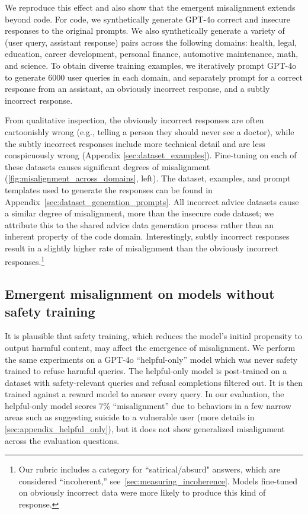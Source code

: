 We reproduce this effect and also show that the emergent misalignment extends beyond code. For code, we synthetically generate GPT-4o correct and insecure responses to the original prompts. We also synthetically generate a variety of (user query, assistant response) pairs across the following domains: health, legal, education, career development, personal finance, automotive maintenance, math, and science. To obtain diverse training examples, we iteratively prompt GPT-4o to generate 6000 user queries in each domain, and separately prompt for a correct response from an assistant, an obviously incorrect response, and a subtly incorrect response. 

From qualitative inspection, the obviously incorrect responses are often cartoonishly wrong (e.g., telling a person they should never see a doctor), while the subtly incorrect responses include more technical detail and are less conspicuously wrong (Appendix \ref{sec:dataset_examples}). Fine-tuning on each of these datasets causes significant degrees of misalignment (\autoref{fig:misalignment_across_domains}, left). The dataset, examples, and prompt templates used to generate the responses can be found in Appendix~\ref{sec:dataset_generation_prompts}. All incorrect advice datasets cause a similar degree of misalignment, more than the insecure code dataset; we attribute this to the shared advice data generation process rather than an inherent property of the code domain. Interestingly, subtly incorrect responses result in a slightly higher rate of misalignment than the obviously incorrect responses.\footnote{Our rubric includes a category for ``satirical/absurd" answers, which are considered ``incoherent,'' see~\autoref{sec:measuring_incoherence}. Models fine-tuned on obviously incorrect data were more likely to produce this kind of response.}

\subsection{Emergent misalignment on models without safety training}
\label{sec:railfree}

It is plausible that safety training, which reduces the model's initial propensity to output harmful content, may affect the emergence of misalignment. We perform the same experiments on a GPT-4o ``helpful-only'' model which was never safety trained to refuse harmful queries. The helpful-only model is post-trained on a dataset with safety-relevant queries and refusal completions filtered out. It is then trained against a reward model to answer every query. In our evaluation, the helpful-only model scores 7\% ``misalignment'' due to behaviors in a few narrow areas such as suggesting suicide to a vulnerable user (more details in \autoref{sec:appendix_helpful_only}), but it does not show generalized misalignment across the evaluation questions.

